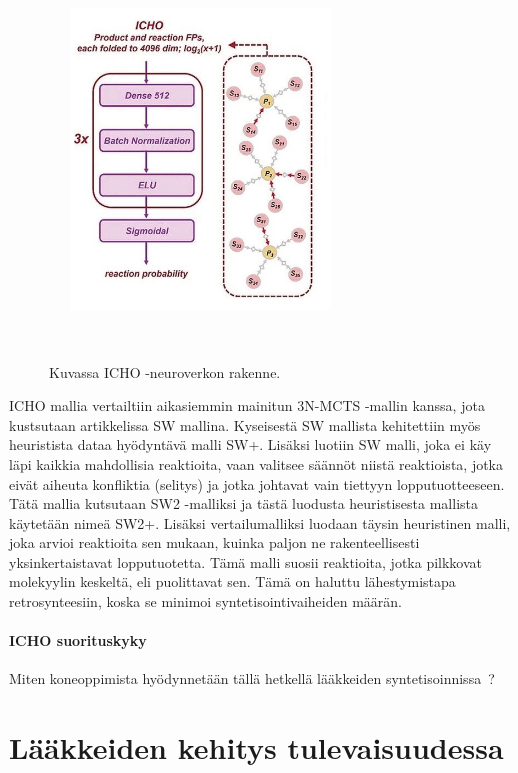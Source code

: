 \documentclass[finnish,twoside,censored,tkt,sw-line]{HYthesisML}
\begin{document}
\begin{figure}
    \centering
    \includegraphics[width=8cm, height=8cm]{icho-neuralnetwork.png}
    \caption{Kuvassa ICHO -neuroverkon rakenne.}
    {~\cite{ExpertKnowledgeRetorsynthesis}}
\end{figure}

ICHO mallia vertailtiin aikasiemmin mainitun 3N-MCTS -mallin kanssa, jota kustsutaan artikkelissa SW mallina.
Kyseisestä SW mallista kehitettiin myös heuristista dataa hyödyntävä malli SW+.
Lisäksi luotiin SW malli, joka ei käy läpi kaikkia mahdollisia reaktioita, vaan valitsee säännöt niistä reaktioista, jotka eivät aiheuta konfliktia (selitys) ja jotka johtavat vain tiettyyn lopputuotteeseen.
Tätä mallia kutsutaan SW2 -malliksi ja tästä luodusta heuristisesta mallista käytetään nimeä SW2+.
Lisäksi vertailumalliksi luodaan täysin heuristinen malli, joka arvioi reaktioita sen mukaan, kuinka paljon ne rakenteellisesti yksinkertaistavat lopputuotetta.
Tämä malli suosii reaktioita, jotka pilkkovat molekyylin keskeltä, eli puolittavat sen.
Tämä on haluttu lähestymistapa retrosynteesiin, koska se minimoi syntetisointivaiheiden määrän.

\subsubsection{ICHO suorituskyky}


Miten koneoppimista hyödynnetään tällä hetkellä lääkkeiden syntetisoinnissa~\cite{SeglerMarwinHS2018Pcsw,ShaharHarelAndKiraRadinsky,ShinBonggun}?

\chapter{Lääkkeiden kehitys tulevaisuudessa}
\end{document}
